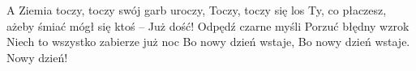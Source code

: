 \documentclass[../../../songbook.tex]{subfiles}
\begin{document}
\-\hspace{1cm} A Ziemia toczy, toczy swój garb uroczy,				 \newline
\-\hspace{1cm} Toczy, toczy się los				 \newline
\-\hspace{1cm} Ty, co płaczesz, ażeby śmiać mógł się ktoś				 \newline
\-\hspace{1cm} – Już dość!				 \newline
\-\hspace{1cm} Odpędź czarne myśli				 \newline
\-\hspace{1cm} Porzuć błędny wzrok				 \newline
\-\hspace{1cm} Niech to wszystko zabierze już noc				 \newline
\-\hspace{1cm} Bo nowy dzień wstaje,				 \newline
\-\hspace{1cm} Bo nowy dzień wstaje.				 \newline
\-\hspace{1cm} Nowy dzień!				 \newline
\end{document}
